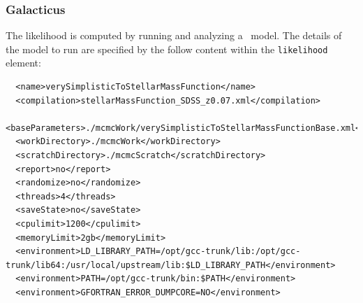 \subsubsection{Galacticus}

The likelihood is computed by running and analyzing a \glc\ model. The details of the model to run are specified by the follow content within the {\tt likelihood} element:
\begin{verbatim}
  <name>verySimplisticToStellarMassFunction</name>
  <compilation>stellarMassFunction_SDSS_z0.07.xml</compilation>
  <baseParameters>./mcmcWork/verySimplisticToStellarMassFunctionBase.xml</baseParameters>
  <workDirectory>./mcmcWork</workDirectory>
  <scratchDirectory>./mcmcScratch</scratchDirectory>
  <report>no</report>
  <randomize>no</randomize>
  <threads>4</threads>
  <saveState>no</saveState>
  <cpulimit>1200</cpulimit>
  <memoryLimit>2gb</memoryLimit>
  <environment>LD_LIBRARY_PATH=/opt/gcc-trunk/lib:/opt/gcc-trunk/lib64:/usr/local/upstream/lib:$LD_LIBRARY_PATH</environment>
  <environment>PATH=/opt/gcc-trunk/bin:$PATH</environment>
  <environment>GFORTRAN_ERROR_DUMPCORE=NO</environment>
\end{verbatim}

